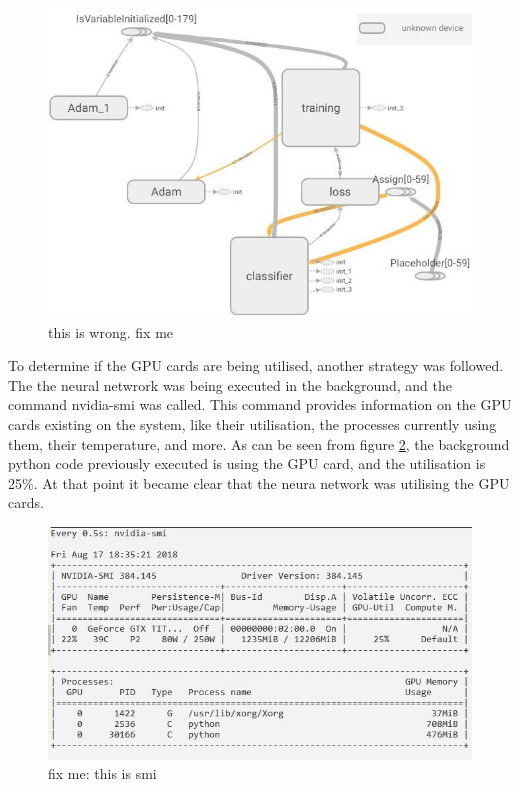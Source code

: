 \begin{figure}[H]
    \centering
    \includegraphics[width=\linewidth]{images/tensorboardgraph1.jpeg}
    \caption{this is wrong. fix me}
    \label{fig:tensorboard2}
\end{figure}


To determine if the GPU cards are being utilised, another strategy was followed. The the neural netwrork was being executed in the background, and the command nvidia-smi was called. This command provides information on the GPU cards existing on the system, like their utilisation, the processes currently using them, their temperature, and more. As can be seen from figure \ref{fig:smi}, the background python code previously executed is using the GPU card, and the utilisation is 25\%. At that point it became clear that the neura network was utilising the GPU cards.
        
        \begin{figure}[H]
            \centering
            \includegraphics[width=\linewidth]{images/smi2.jpg}
            \caption{fix me: this is smi}
            \label{fig:smi}
        \end{figure}


